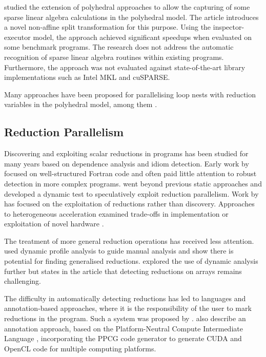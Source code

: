     \citet{Zhang:2016:CTG:3018843.3018849} studied the extension of polyhedral
    approaches to allow the capturing of some sparse linear algebra
    calculations in the polyhedral model.
    The article introduces a novel non-affine split transformation for this
    purpose.
    Using the inspector-executor model, the approach achieved significant
    speedups when evaluated on some benchmark programs.
    The research does not address the automatic recognition of sparse
    linear algebra routines within existing programs.
    Furthermore, the approach was not evaluated against state-of-the-art
    library implementations such as Intel MKL and cuSPARSE.

    Many approaches have been proposed for parallelising loop nests with
    reduction variables in the polyhedral model, among them
    \citet{jouvelot1989unified,redon1994scheduling,chi1997optimizing,
    gupta2006simplifying,stock2014framework}.

\subsection{Reduction Parallelism}

    Discovering and exploiting scalar reductions in programs has been studied
    for many years based on dependence analysis and idiom detection.
    Early work by
    \citet{pottenger1995idiom,suganuma1996detection,fisher1994parallelizing}
    focused on well-structured Fortran code and often paid little attention to
    robust detection in more complex programs.
    \citet{rauchwerger1999lrpd} went beyond previous static approaches and
    developed a dynamic test to speculatively exploit reduction parallelism.
    Work by
    \citet{Gutierrez:2000,gutierrez2003optimization,gutierrez2008analytical}
    has focused on the exploitation of reductions rather than discovery.
    Approaches to heterogeneous acceleration examined trade-offs in
    implementation \citep{yu2006adaptive} or exploitation of novel hardware
    \citep{ravi2010compiler,Huo2011HiPC}.

    The treatment of more general reduction operations has received less
    attention.
    \citet{das2010experiences} used dynamic profile analysis to guide
    manual analysis and show there is potential for finding generalised
    reductions.
    \citet{kim2012dynamic} explored the use of dynamic analysis further
    but states in the article that detecting reductions on arrays remains
    challenging.

    The difficulty in automatically detecting reductions has led to languages
    and annotation-based approaches, where it is the responsibility of the user
    to mark reductions in the program.
    Such a system was proposed by \citet{deitz2002high}.
    \citet{Reddy2016Reduction} also describe an annotation approach,
    based on the Platform-Neutral Compute Intermediate Language
    \citep{baghdadi2015PENCIL}, incorporating the PPCG code generator to
    generate CUDA and OpenCL code for multiple computing platforms.

